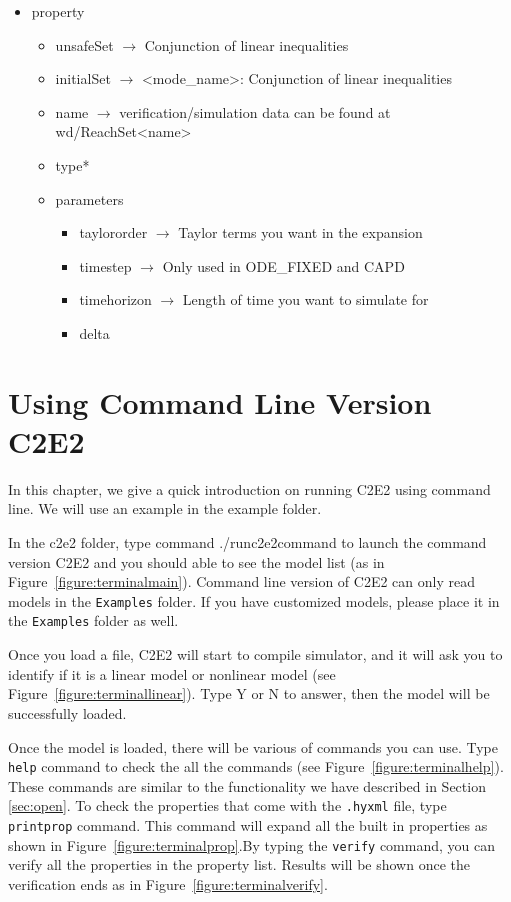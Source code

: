 \documentclass{tufte-book} %
\begin{document}
\begin{itemize}
\item property
	\begin{itemize}
	\item unsafeSet $\rightarrow$ Conjunction of linear inequalities
	\item initialSet $\rightarrow$ <mode\_name>: Conjunction of linear inequalities
	\item name $\rightarrow$ verification/simulation data can be found at wd/ReachSet<name>
	\item type*
	\item parameters
    	\begin{itemize}
		\item taylororder $\rightarrow$ Taylor terms you want in the expansion
		\item timestep $\rightarrow$ Only used in ODE\_FIXED and CAPD
		\item timehorizon $\rightarrow$ Length of time you want to simulate for
		\item delta
        \end{itemize}
    \end{itemize}
\end{itemize}

\chapter{Using Command Line Version C2E2}

In this chapter, we give a quick introduction on running C2E2 using command line. We will use an example in the example folder.

In the c2e2 folder, type command ./runc2e2command to launch the command version C2E2 and you should able to see the model list (as in Figure~\ref{figure:terminalmain}). Command line version of C2E2 can only read models in the \texttt{Examples} folder. If you have customized models, please place it in the \texttt{Examples} folder as well. 
\newline

Once you load a file, C2E2 will start to compile simulator, and it will ask you to identify if it is a linear model or nonlinear model (see Figure~\ref{figure:terminallinear}). Type Y or N to answer, then the model will be successfully loaded.

Once the model is loaded, there will be various of commands you can use. Type \texttt{help} command to check the all the commands (see Figure~\ref{figure:terminalhelp}). These commands are similar to the functionality we have described in Section \ref{sec:open}. To check the properties that come with the \texttt{.hyxml} file, type \texttt{printprop} command. This command will expand all the built in properties as shown in Figure~\ref{figure:terminalprop}.By typing the \texttt{verify} command, you can verify all the properties in the property list. Results will be shown once the verification ends as in Figure~\ref{figure:terminalverify}.
\end{document}
